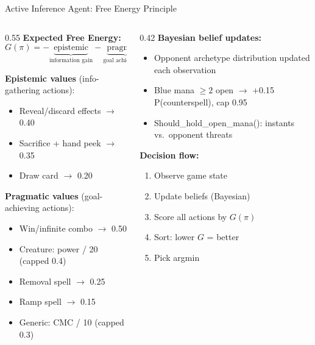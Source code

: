 \documentclass[aspectratio=169, 10pt]{beamer}
\begin{document}
\begin{frame}{Active Inference Agent: Free Energy Principle}
  \begin{columns}[T]
    \begin{column}{0.55\textwidth}
      \footnotesize
      \textbf{Expected Free Energy:}
      $$G(\pi) = -\underbrace{\text{epistemic}}_{\text{information gain}} - \underbrace{\text{pragmatic}}_{\text{goal achievement}}$$

      \textbf{Epistemic values} (info-gathering actions):
      \begin{itemize}\scriptsize
        \item Reveal/discard effects $\to$ 0.40
        \item Sacrifice + hand peek $\to$ 0.35
        \item Draw card $\to$ 0.20
      \end{itemize}
      \vspace{0.15cm}
      \textbf{Pragmatic values} (goal-achieving actions):
      \begin{itemize}\scriptsize
        \item Win/infinite combo $\to$ 0.50
        \item Creature: power / 20 (capped 0.4)
        \item Removal spell $\to$ 0.25
        \item Ramp spell $\to$ 0.15
        \item Generic: CMC / 10 (capped 0.3)
      \end{itemize}
    \end{column}
    \begin{column}{0.42\textwidth}
      \footnotesize
      \textbf{Bayesian belief updates:}
      \begin{itemize}\scriptsize
        \item Opponent archetype distribution updated each observation
        \item Blue mana $\geq 2$ open $\to$ $+$0.15 P(counterspell), cap 0.95
        \item Should\_hold\_open\_mana(): instants vs.\ opponent threats
      \end{itemize}
      \vspace{0.2cm}
      \textbf{Decision flow:}
      \begin{enumerate}\scriptsize
        \item Observe game state
        \item Update beliefs (Bayesian)
        \item Score all actions by $G(\pi)$
        \item Sort: lower $G$ = better
        \item Pick argmin
      \end{enumerate}
    \end{column}
  \end{columns}
\end{frame}
\end{document}
